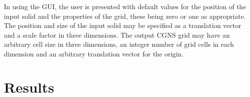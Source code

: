 \documentclass[a4paper,10pt]{article}
\begin{document}
In using the GUI, the user is presented with default values for the position of
the input solid and the properties of the grid, these being zero or one as
appropriate. The position and size of the input solid may be specified as a
translation vector and a scale factor in three dimensions. The output CGNS grid
may have an arbitrary cell size in three dimensions, an integer number of grid
cells in each dimension and an arbitrary translation vector for the origin.

\section{Results}


\end{document}
